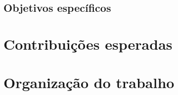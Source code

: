 \subsection{Objetivos específicos}
\label{subsec:introducao-objetivos-especificos}

\section{Contribuições esperadas}
\label{sec:introducao-contribuicoes-esperadas}

\section{Organização do trabalho}
\label{sec:introducao-organizacao-do-trabalho}
